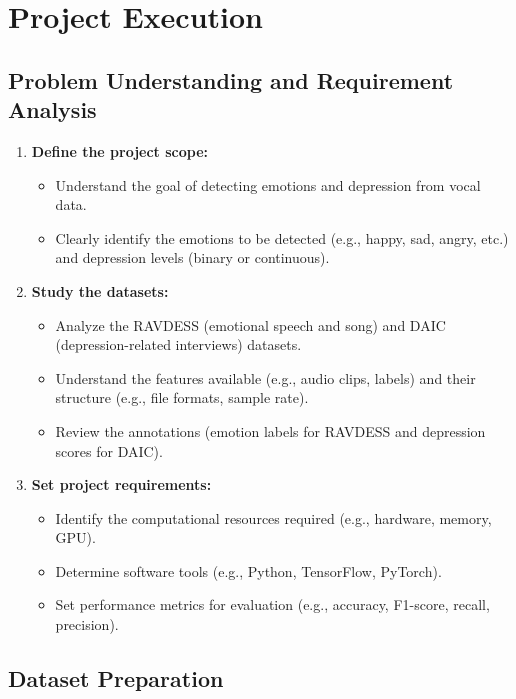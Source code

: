 
\chapter{Project Execution}

\section{Problem Understanding and Requirement Analysis}

\begin{enumerate}
    \item \textbf{Define the project scope:}
    \begin{itemize}
        \item Understand the goal of detecting emotions and depression from vocal data.
        \item Clearly identify the emotions to be detected (e.g., happy, sad, angry, etc.) and depression levels (binary or continuous).
    \end{itemize}
    \item \textbf{Study the datasets:}
    \begin{itemize}
        \item Analyze the RAVDESS (emotional speech and song) and DAIC (depression-related interviews) datasets.
        \item Understand the features available (e.g., audio clips, labels) and their structure (e.g., file formats, sample rate).
        \item Review the annotations (emotion labels for RAVDESS and depression scores for DAIC).
    \end{itemize}
    \item \textbf{Set project requirements:}
    \begin{itemize}
        \item Identify the computational resources required (e.g., hardware, memory, GPU).
        \item Determine software tools (e.g., Python, TensorFlow, PyTorch).
        \item Set performance metrics for evaluation (e.g., accuracy, F1-score, recall, precision).
    \end{itemize}
\end{enumerate}

\section{Dataset Preparation}

